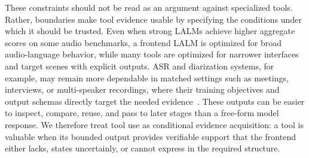 \documentclass[11pt]{article}
\begin{document}
These constraints should not be read as an argument against specialized tools. Rather, boundaries make tool evidence usable by specifying the conditions under which it should be trusted. Even when strong LALMs achieve higher aggregate scores on some audio benchmarks, a frontend LALM is optimized for broad audio-language behavior, while many tools are optimized for narrower interfaces and target scenes with explicit outputs. ASR and diarization systems, for example, may remain more dependable in matched settings such as meetings, interviews, or multi-speaker recordings, where their training objectives and output schemas directly target the needed evidence~\citep{shi2026qwen3asr,xu2025fireredasr,han2025efficient_diarization,park2025sortformer}. These outputs can be easier to inspect, compare, reuse, and pass to later stages than a free-form model response. We therefore treat tool use as conditional evidence acquisition: a tool is valuable when its bounded output provides verifiable support that the frontend either lacks, states uncertainly, or cannot express in the required structure.
\end{document}
